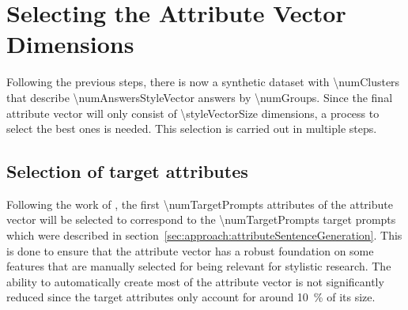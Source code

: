 

\section{Selecting the Attribute Vector Dimensions}
\label{sec:approach:selection}

Following the previous steps, there is now a synthetic dataset with \num{\numClusters} that describe \num{\numAnswersStyleVector} answers by \num{\numGroups}. Since the final attribute vector will only consist of \num{\styleVectorSize} dimensions, a process to select the best ones is needed. This selection is carried out in multiple steps.

\subsection{Selection of target attributes}
\label{sec:approach:selection:targetAttributes}
Following the work of \citet{patelLearningInterpretableStyle2023}, the first \num{\numTargetPrompts} attributes of the attribute vector will be selected to correspond to the \num{\numTargetPrompts} target prompts which were described in section~\ref{sec:approach:attributeSentenceGeneration}.
This is done to ensure that the attribute vector has a robust foundation on some features that are manually selected for being relevant for stylistic research. The ability to automatically create most of the attribute vector is not significantly reduced since the target attributes only account for around \SI{10}{\percent} of its size.


